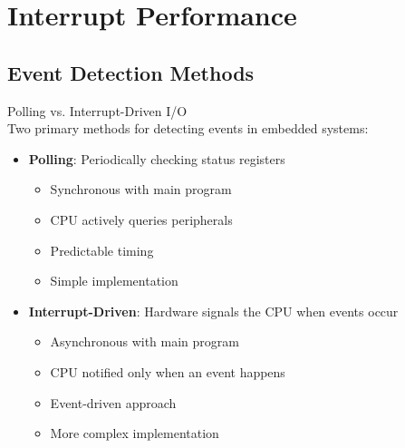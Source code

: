 \section{Interrupt Performance}

\subsection{Event Detection Methods}

\begin{concept}{Polling vs. Interrupt-Driven I/O}\\
Two primary methods for detecting events in embedded systems:
\begin{itemize}
    \item \textbf{Polling}: Periodically checking status registers
    \begin{itemize}
        \item Synchronous with main program
        \item CPU actively queries peripherals
        \item Predictable timing
        \item Simple implementation
    \end{itemize}
    \item \textbf{Interrupt-Driven}: Hardware signals the CPU when events occur
    \begin{itemize}
        \item Asynchronous with main program
        \item CPU notified only when an event happens
        \item Event-driven approach
        \item More complex implementation
    \end{itemize}
\end{itemize}
\end{concept}

